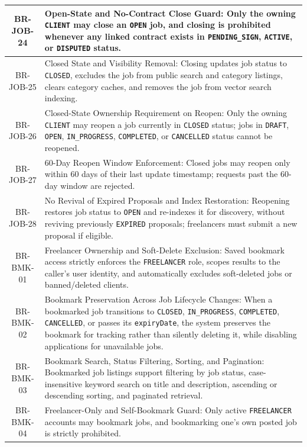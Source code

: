 \begin{longtable}{|c|p{12cm}|}
    BR-JOB-24 & Open-State and No-Contract Close Guard: Only the owning \texttt{CLIENT} may close an \texttt{OPEN} job, and closing is prohibited whenever any linked contract exists in \texttt{PENDING\_SIGN}, \texttt{ACTIVE}, or \texttt{DISPUTED} status. \\ \hline
    BR-JOB-25 & Closed State and Visibility Removal: Closing updates job status to \texttt{CLOSED}, excludes the job from public search and category listings, clears category caches, and removes the job from vector search indexing. \\ \hline
    BR-JOB-26 & Closed-State Ownership Requirement on Reopen: Only the owning \texttt{CLIENT} may reopen a job currently in \texttt{CLOSED} status; jobs in \texttt{DRAFT}, \texttt{OPEN}, \texttt{IN\_PROGRESS}, \texttt{COMPLETED}, or \texttt{CANCELLED} status cannot be reopened. \\ \hline
    BR-JOB-27 & 60-Day Reopen Window Enforcement: Closed jobs may reopen only within 60 days of their last update timestamp; requests past the 60-day window are rejected. \\ \hline
    BR-JOB-28 & No Revival of Expired Proposals and Index Restoration: Reopening restores job status to \texttt{OPEN} and re-indexes it for discovery, without reviving previously \texttt{EXPIRED} proposals; freelancers must submit a new proposal if eligible. \\ \hline
    BR-BMK-01 & Freelancer Ownership and Soft-Delete Exclusion: Saved bookmark access strictly enforces the \texttt{FREELANCER} role, scopes results to the caller's user identity, and automatically excludes soft-deleted jobs or banned/deleted clients. \\ \hline
    BR-BMK-02 & Bookmark Preservation Across Job Lifecycle Changes: When a bookmarked job transitions to \texttt{CLOSED}, \texttt{IN\_PROGRESS}, \texttt{COMPLETED}, \texttt{CANCELLED}, or passes its \texttt{expiryDate}, the system preserves the bookmark for tracking rather than silently deleting it, while disabling applications for unavailable jobs. \\ \hline
    BR-BMK-03 & Bookmark Search, Status Filtering, Sorting, and Pagination: Bookmarked job listings support filtering by job status, case-insensitive keyword search on title and description, ascending or descending sorting, and paginated retrieval. \\ \hline
    BR-BMK-04 & Freelancer-Only and Self-Bookmark Guard: Only active \texttt{FREELANCER} accounts may bookmark jobs, and bookmarking one's own posted job is strictly prohibited. \\ \hline

\end{longtable}
